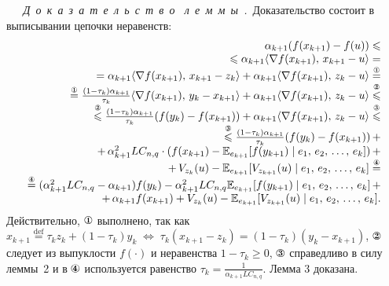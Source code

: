 \documentclass[11pt]{article}
\newcommand{\E}{\mathbb{E}}
\newcommand{\circledOne}{\text{\ding{172}}}
\newcommand{\circledTwo}{\text{\ding{173}}}
\newcommand{\circledThree}{\text{\ding{174}}}
\newcommand{\circledFour}{\text{\ding{175}}}
\begin{document}
		\textsl{~~~Д~о~к~а~з~а~т~е~л~ь~с~т~в~о~\; л~е~м~м~ы~.}\,
		Доказательство состоит в выписывании цепочки неравенств:
		\begin{equation*}
			\begin{array}{rl}
				\alpha_{k+1}(f(x_{k+1}) - f(u)) \leqslant\\
				\leqslant \alpha_{k+1}\langle\nabla f(x_{k+1}), \, x_{k+1}-u\rangle=\\
				= \alpha_{k+1}\langle\nabla f(x_{k+1}), \, x_{k+1}-z_k\rangle + \alpha_{k+1}\langle\nabla f(x_{k+1}), \, z_{k}-u\rangle\overset{\circledOne}{=}\\
				\overset{\circledOne}{=} \frac{(1-\tau_k)\alpha_{k+1}}{\tau_k}\langle\nabla f(x_{k+1}), \, y_{k}-x_{k+1}\rangle+\alpha_{k+1}\langle\nabla f(x_{k+1}), \, z_{k}-u\rangle\overset{\circledTwo}{\leqslant}\\
				\overset{\circledTwo}{\leqslant} \frac{(1-\tau_k)\alpha_{k+1}}{\tau_k} (f(y_k)-f(x_{k+1})) + \alpha_{k+1}\langle\nabla f(x_{k+1}), \, z_{k}-u\rangle\overset{\circledThree}{\leqslant}\\ \overset{\circledThree}{\leqslant} \frac{(1-\tau_k)\alpha_{k+1}}{\tau_k} (f(y_k)-f(x_{k+1})) \, + \\ 
				+ \, \alpha_{k+1}^2LC_{n,q}\cdot(f(x_{k+1}) - \E_{e_{k+1}}[f(y_{k+1})\mid e_1, \, e_2, \, \ldots, \, e_k]) \, +
				\\ 
				+ \, V_{z_k}(u) - \E_{e_{k+1}}[V_{z_{k+1}}(u)\mid e_1, \, e_2, \, \ldots, \, e_k]\overset{\circledFour}{=}\\
				\overset{\circledFour}{=} (\alpha_{k+1}^2LC_{n,q}-\alpha_{k+1})f(y_k) - \alpha_{k+1}^2LC_{n,q}\E_{e_{k+1}}[f(y_{k+1})\mid e_1, \, e_2, \, \ldots, \, e_k] \, +\\
				+ \, \alpha_{k+1}f(x_{k+1}) + V_{z_k}(u) - \E_{e_{k+1}}[V_{z_{k+1}}(u)\mid e_1, \, e_2, \, \ldots, \, e_k].
			\end{array}
		\end{equation*}
		Действительно, $\circledOne$ выполнено, так как $x_{k+1} \overset{\text{def}}{=} \tau_kz_k+(1-\tau_k)y_k\; \Leftrightarrow\; \tau_k(x_{k+1}-z_k) = (1-\tau_k)(y_k - x_{k+1})$, $\circledTwo$ следует из выпуклости $f(\cdot)$ и неравенства $1-\tau_k\geqslant0$, $\circledThree$ справедливо в силу леммы~2 и в $\circledFour$ используется равенство $\tau_k = \frac{1}{\alpha_{k+1}LC_{n,q}}$. Лемма 3 доказана.
		
\end{document}
